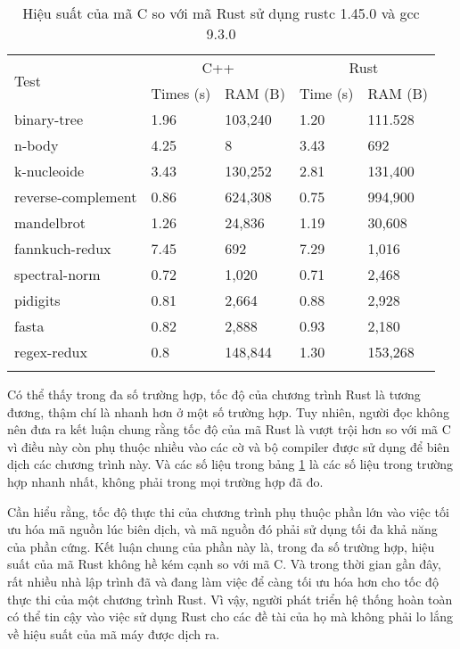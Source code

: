 \pagebreak
\begin{longtable}{p{} p{} p{} p{} p{}} \toprule
\multirow{2}{0.1\textwidth}{Test} & \multicolumn{2}{c}{C++} & \multicolumn{2}{c}{Rust} \\
\cline{2-5}
& Times (s) & RAM (B) & Time (s) & RAM (B) \\
\midrule
\endhead
binary-tree & 1.96 & 103,240 & 1.20 & 111.528 \\
n-body & 4.25 & 8 & 3.43 & 692 \\
k-nucleoide & 3.43 & 130,252  & 2.81 & 131,400 \\
reverse-complement & 0.86 & 624,308 & 0.75 & 994,900 \\
mandelbrot & 1.26 & 24,836 & 1.19 & 30,608 \\
fannkuch-redux & 7.45 & 692 & 7.29 & 1,016 \\
spectral-norm & 0.72 & 1,020 & 0.71 & 2,468 \\
pidigits & 0.81 & 2,664 & 0.88 & 2,928 \\
fasta & 0.82 & 2,888 & 0.93 & 2,180 \\
regex-redux & 0.8 & 148,844 & 1.30 & 153,268 \\
\bottomrule
\caption{Hiệu suất của mã C so với mã Rust sử dụng rustc 1.45.0 và gcc 9.3.0}
\label{tbl:rust_c_comparison}
\end{longtable}

Có thể thấy trong đa số trường hợp, tốc độ của chương trình Rust là tương đương, thậm chí là nhanh hơn ở một số trường hợp.
Tuy nhiên, người đọc không nên đưa ra kết luận chung rằng tốc độ của mã Rust là vượt trội hơn so với mã C vì điều này còn phụ thuộc nhiều vào các cờ và bộ compiler được sử dụng để biên dịch các chương trình này.
Và các số liệu trong bảng \ref{tbl:rust_c_comparison} là các số liệu trong trường hợp nhanh nhất, không phải trong mọi trường hợp đã đo.

Cần hiểu rằng, tốc độ thực thi của chương trình phụ thuộc phần lớn vào việc tối ưu hóa mã nguồn lúc biên dịch, và mã nguồn đó phải sử dụng tối đa khả năng của phần cứng.
Kết luận chung của phần này là, trong đa số trường hợp, hiệu suất của mã Rust không hề kém cạnh so với mã C.
Và trong thời gian gần đây, rất nhiều nhà lập trình đã và đang làm việc để càng tối ưu hóa hơn cho tốc độ thực thi của một chương trình Rust.
Vì vậy, người phát triển hệ thống hoàn toàn có thể tin cậy vào việc sử dụng Rust cho các đề tài của họ mà không phải lo lắng về hiệu suất của mã máy được dịch ra.

